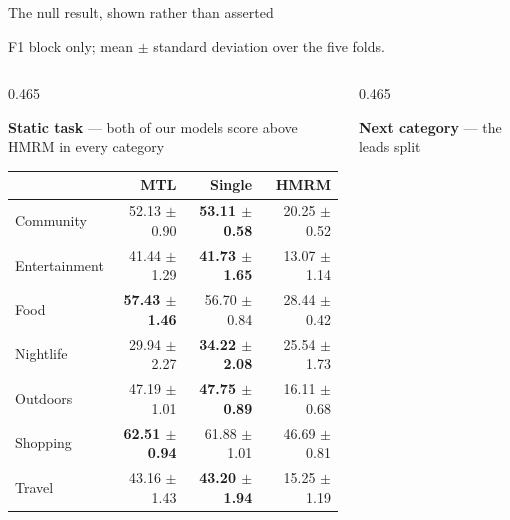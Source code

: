 \documentclass{beamer}
\begin{document}
\begin{frame}{The null result, shown rather than asserted}

    {\centering\scriptsize F1 block only; mean $\pm$ standard deviation over the five folds.\par}

    \begin{columns}[t,onlytextwidth]
        \begin{column}{0.465\textwidth}
            {\centering\scriptsize\textbf{Static task} --- both of our models score above HMRM in every category\par}
            {\scriptsize
            \setlength{\tabcolsep}{1pt}
            \renewcommand{\arraystretch}{1.1}\begin{tabular}{@{}lrrr@{}}
                \toprule
                 & \textbf{MTL} & \textbf{Single} & \textbf{HMRM} \\
                \midrule
                Community     & 52.13 $\pm$ 0.90          & \textbf{53.11 $\pm$ 0.58} & 20.25 $\pm$ 0.52 \\
                Entertainment & 41.44 $\pm$ 1.29          & \textbf{41.73 $\pm$ 1.65} & 13.07 $\pm$ 1.14 \\
                Food          & \textbf{57.43 $\pm$ 1.46} & 56.70 $\pm$ 0.84          & 28.44 $\pm$ 0.42 \\
                Nightlife     & 29.94 $\pm$ 2.27          & \textbf{34.22 $\pm$ 2.08} & 25.54 $\pm$ 1.73 \\
                Outdoors      & 47.19 $\pm$ 1.01          & \textbf{47.75 $\pm$ 0.89} & 16.11 $\pm$ 0.68 \\
                Shopping      & \textbf{62.51 $\pm$ 0.94} & 61.88 $\pm$ 1.01          & 46.69 $\pm$ 0.81 \\
                Travel        & 43.16 $\pm$ 1.43          & \textbf{43.20 $\pm$ 1.94} & 15.25 $\pm$ 1.19 \\
                \bottomrule
            \end{tabular}\par}
        \end{column}
        \hfill
        \begin{column}{0.465\textwidth}
            {\centering\scriptsize\textbf{Next category} --- the leads split\par}
            {\scriptsize
            \setlength{\tabcolsep}{1pt}
            \renewcommand{\arraystretch}{1.1}\begin{tabular}{@{}lrrr@{}}

\end{tabular}}
\end{column}
\end{columns}
\end{frame}
\end{document}
